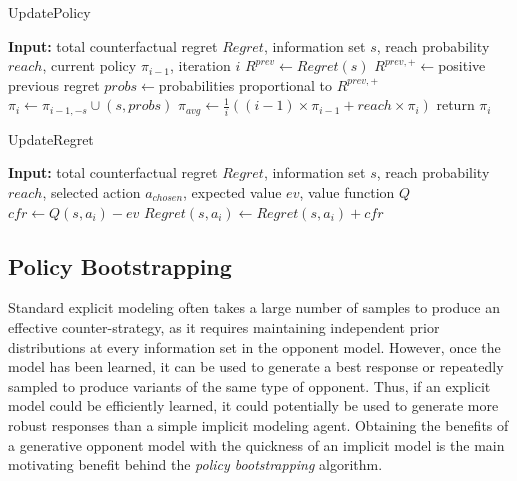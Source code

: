 \documentclass{aamas2013}
\begin{document}
    \begin{algorithm}
    \caption{UpdatePolicy}
    \label{alg-tdcfr-updatepolicy}
    \begin{algorithmic}
    \STATE \textbf{Input:} total counterfactual regret $Regret$, information set $s$, reach probability $reach$, current policy $\pi_{i-1}$, iteration $i$
    \STATE $R^{prev} \leftarrow Regret(s)$
    \STATE $R^{prev,+} \leftarrow$positive previous regret
    \STATE $probs \leftarrow$probabilities proportional to $R^{prev,+}$
    \STATE $\pi_{i} \leftarrow \pi_{i-1,-s} \cup (s,probs)$
    \STATE $\pi_{avg} \leftarrow \frac{1}{i} ((i-1)\times \pi_{i-1} + reach \times \pi_i)$
    \STATE return $\pi_{i}$
    \end{algorithmic}
    \end{algorithm}

    \begin{algorithm}
    \caption{UpdateRegret}
    \label{alg-tdcfr-updateregret}
    \begin{algorithmic}
    \STATE \textbf{Input:} total counterfactual regret $Regret$, information set $s$, reach probability $reach$, selected action $a_{chosen}$, expected value $ev$, value function $Q$
        \STATE $cfr \leftarrow Q(s,a_{i}) - ev$
        \STATE $Regret(s,a_{i}) \leftarrow Regret(s,a_{i}) + cfr$
    \ENDFOR
    \end{algorithmic}
    \end{algorithm}

    \subsection{Policy Bootstrapping}
    Standard explicit modeling often takes a large number of samples to produce an effective counter-strategy, as it requires maintaining independent prior distributions at every information set in the opponent model. However, once the model has been learned, it can be used to generate a best response or repeatedly sampled to produce variants of the same type of opponent. Thus, if an explicit model could be efficiently learned, it could potentially be used to generate more robust responses than a simple implicit modeling agent. Obtaining the benefits of a generative opponent model with the quickness of an implicit model is the main motivating benefit behind the \textit{policy bootstrapping} algorithm.
\end{document}
